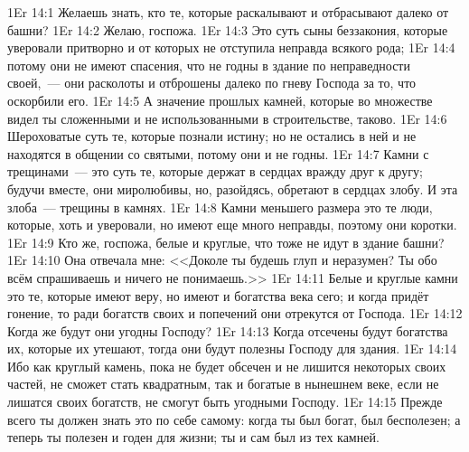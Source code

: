 \vs 1Er 14:1
Желаешь знать, кто те,
которые раскалывают и отбрасывают далеко от башни?
\vs 1Er 14:2
Желаю, госпожа.
\vs 1Er 14:3
Это суть сыны беззакония,
которые уверовали притворно и от которых не отступила неправда всякого рода;
\vs 1Er 14:4
потому они не имеют спасения,
что не годны в здание по неправедности своей,~--- они расколоты и
отброшены далеко по гневу Господа за то, что оскорбили его.
\vs 1Er 14:5
А значение прошлых камней,
которые во множестве видел ты сложенными
и не использованными в строительстве, таково.
\vs 1Er 14:6
Шероховатые суть те,
которые познали истину; но не остались в ней и не находятся в общении со
святыми, потому они и не годны.
\vs 1Er 14:7
Камни с трещинами~--- это
суть те, которые держат в сердцах вражду друг к другу; будучи вместе, они
миролюбивы, но, разойдясь, обретают в сердцах злобу.
И эта злоба~--- трещины в камнях.
\vs 1Er 14:8
Камни меньшего размера
это те люди, которые, хоть и уверовали, но имеют еще много неправды, поэтому
они коротки.
\vs 1Er 14:9
Кто же, госпожа, белые и
круглые, что тоже не идут в здание башни?
\vs 1Er 14:10
Она отвечала мне:
<<Доколе ты будешь глуп и неразумен?
Ты обо всём спрашиваешь и ничего не понимаешь.>>
\vs 1Er 14:11
Белые и круглые камни
это те, которые имеют веру, но имеют и богатства века сего; и когда придёт
гонение, то ради богатств своих и попечений они отрекутся от Господа.
\vs 1Er 14:12
Когда же будут они угодны Господу?
\vs 1Er 14:13
Когда отсечены будут богатства их, которые их утешают,
тогда они будут полезны Господу для здания.
\vs 1Er 14:14
Ибо как круглый камень,
пока не будет обсечен и не лишится некоторых своих частей, не сможет стать
квадратным, так и богатые в нынешнем веке, если не лишатся своих богатств, не
смогут быть угодными Господу.
\vs 1Er 14:15
Прежде всего ты должен знать это по себе самому:
когда ты был богат, был бесполезен; а теперь ты
полезен и годен для жизни; ты и сам был из тех камней.

